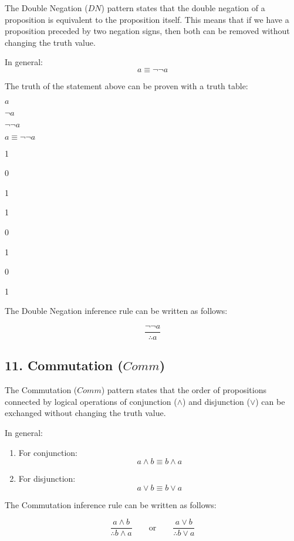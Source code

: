 The Double Negation (\(DN\)) pattern states that the double negation of
a proposition is equivalent to the proposition itself. This means that
if we have a proposition preceded by two negation signs, then both can
be removed without changing the truth value.

In general:\\
\[a \equiv \lnot \lnot a\]

The truth of the statement above can be proven with a truth table:

\(a\)

\(\lnot a\)

\(\lnot \lnot a\)

\(a \equiv \lnot \lnot a\)

1

0

1

1

0

1

0

1

The Double Negation inference rule can be written as follows:

\[
\frac{\lnot \lnot a}{\therefore a}
\]

\subsection{\texorpdfstring{11. Commutation
(\(Comm\))}{11. Commutation (Comm)}}\label{commutation-comm}

The Commutation (\(Comm\)) pattern states that the order of propositions
connected by logical operations of conjunction (\(\land\)) and
disjunction (\(\lor\)) can be exchanged without changing the truth
value.

In general:

\begin{enumerate}
\def\labelenumi{\arabic{enumi}.}
\item
  For conjunction:\\
  \[a \land b \equiv b \land a\]
\item
  For disjunction:\\
  \[a \lor b \equiv b \lor a\]
\end{enumerate}

The Commutation inference rule can be written as follows:

\[
\frac{a \land b}{\therefore b \land a}
\qquad \text{or} \qquad
\frac{a \lor b}{\therefore b \lor a}
\]

